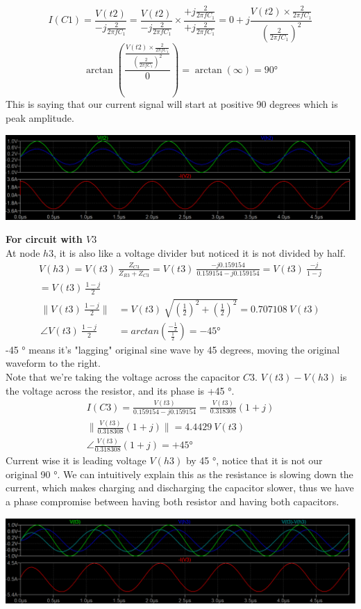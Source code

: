\documentclass{article}
\begin{document}
	\[I(C1)=\frac{V(t2)}{-j\frac{2}{2\pi fC_{1}}}=\frac{V(t2)}{-j\frac{2}{2\pi fC_{1}}}\times\frac{+j\frac{2}{2\pi fC_{1}}}{+j\frac{2}{2\pi fC_{1}}}=0+j\frac{V(t2)\times \frac{2}{2\pi fC_{1}}}{(\frac{2}{2\pi fC_{1}})^2}\]
	\[\arctan(\frac{\frac{V(t2)\times \frac{2}{2\pi fC_{1}}}{(\frac{2}{2\pi fC_{1}})^2}}{0})=\arctan(\infty)=90\si{\degree}\]
	This is saying that our current signal will start at positive 90 degrees which is peak amplitude.
	\begin{center}
		\includegraphics[width=\textwidth]{imgs/v2_circuit.png} \\
	\end{center}
	\textbf{For circuit with $V3$} \\
	At node $h3$, it is also like a voltage divider but noticed it is not divided by half.
	\begin{align*}
		V(h3)=V(t3)\ \frac{Z_{C3}}{Z_{R3}+Z_{C3}}=V(t3)\ \frac{-j0.159154}{0.159154-j0.159154}=V(t3)\ \frac{-j}{1-j} \\
		=V(t3)\ \frac{1-j}{2}
	\end{align*}
	\begin{align*}
		\Big\|V(t3)\ \frac{1-j}{2}\Big\|&=V(t3)\ \sqrt{\left(\frac{1}{2}\right)^2+\left(\frac{1}{2}\right)^2}=0.707108\ V(t3) \\
		\angle V(t3)\ \frac{1-j}{2}&=arctan\left(\frac{-\frac{1}{2}}{\frac{1}{2}}\right)=-45\si{\degree}
	\end{align*}
	-45 \si{\degree} means it's "lagging" original sine wave by 45 degrees, moving the original waveform to the right. \\
	Note that we're taking the voltage across the capacitor $C3$. $V(t3)-V(h3)$ is the voltage across the resistor, and its phase is +45 \si{\degree}.
	\begin{gather*}
		I(C3)=\frac{V(t3)}{0.159154-j0.159154}=\frac{V(t3)}{0.318308}(1+j) \\
		\Big\|\frac{V(t3)}{0.318308}(1+j)\Big\|=4.4429\ V(t3)\\
		\angle\frac{V(t3)}{0.318308}(1+j)=+45\si{\degree}
	\end{gather*}
	Current wise it is leading voltage $V(h3)$ by 45 \si{\degree}, notice that it is not our original 90 \si{\degree}. We can intuitively explain this as the resistance is slowing down the current, which makes charging and discharging the capacitor slower, thus we have a phase compromise between having both resistor and having both capacitors. 
	\begin{center}
		\includegraphics[width=\textwidth]{imgs/v3_circuit.png} \\
	\end{center}
		
\end{document}
